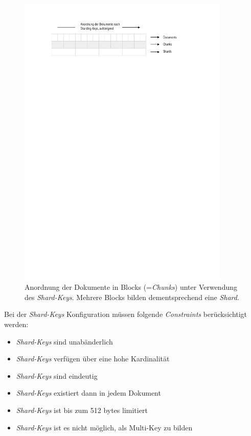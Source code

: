 \begin{figure}[H]
\centering
 \includegraphics[trim = 25mm 240mm 40mm 20mm, clip, width=0.9\textwidth]{resources/replicaSet/sharding-keys}
\caption[Anordnung der Dokumente in Blocks (=\textit{Chunks}) unter Verwendung des \textit{Shard-Keys}. Mehrere Blocks bilden dementsprechend eine \textit{Shard}.]{Anordnung der Dokumente in Blocks (=\textit{Chunks}) unter Verwendung des \textit{Shard-Keys}. Mehrere Blocks bilden dementsprechend eine \textit{Shard}.}
\label{img:shardKeys}
\end{figure}

Bei der \textit{Shard-Keys} Konfiguration müssen folgende \textit{Constraints}  \cite{sharding} berücksichtigt werden:
\begin{itemize}
\item \textit{Shard-Keys} sind unabänderlich
\item \textit{Shard-Keys} verfügen über eine hohe Kardinalität
\item \textit{Shard-Keys} sind eindeutig
\item \textit{Shard-Keys} existiert dann in jedem Dokument
\item \textit{Shard-Keys} ist bis zum 512 bytes limitiert
\item \textit{Shard-Keys} ist es nicht möglich, als Multi-Key zu bilden
\end{itemize}

